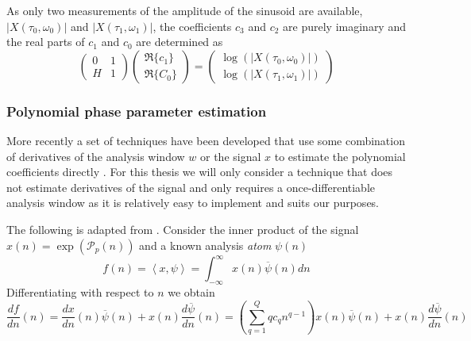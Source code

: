 \documentclass[letterpaper,12pt]{report}
\begin{document}
As only two measurements of the amplitude of the sinusoid are available,
$|X(\tau_0,\omega_0)|$ and $|X(\tau_1,\omega_1)|$, the coefficients
$c_3$ and $c_2$ are purely imaginary and the real parts of $c_1$ and $c_0$ are
determined as
\begin{equation}
    \begin{pmatrix}
        0 & 1 \\
        H & 1
    \end{pmatrix}
    \begin{pmatrix}
        \Re\{c_1\} \\
        \Re\{C_0\}
    \end{pmatrix}
    =
    \begin{pmatrix}
        \log(|X(\tau_0,\omega_0)|) \\
        \log(|X(\tau_1,\omega_1)|)
    \end{pmatrix}
\end{equation}

\subsubsection{Polynomial phase parameter estimation}
\label{sec:ddm_description}
More recently a set of techniques have been developed that use some combination
of derivatives of the analysis window $w$ or the signal $x$ to estimate the
polynomial coefficients directly \cite{hamilton2011non}. For this thesis we will
only consider a technique that does not estimate derivatives of the signal and
only requires a once-differentiable analysis window as it is relatively easy to
implement and suits our purposes.

The following is adapted from \cite{betser2009sinusoidal}. Consider the inner
product of the signal $x(n) = \exp(\mathcal{P}_p(n)) $ and a
known analysis \textit{atom} $\psi(n)$
\[
    f(n) = \left\langle x,\psi \right\rangle =
    \int_{-\infty}^{\infty}x(n)\overline{\psi}(n)dn
\]
Differentiating with respect to $n$ we obtain
\[
    \frac{df}{dn}(n) = \frac{dx}{dn}(n)\overline{\psi}(n)
    + x(n)\frac{d\overline{\psi}}{dn}(n)
    = \left( \sum_{q=1}^{Q} q c_q n^{q-1} \right) x(n)\overline{\psi}(n)
    + x(n)\frac{d\overline{\psi}}{dn}(n)
\]
\end{document}
